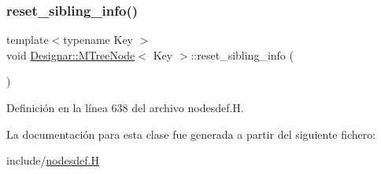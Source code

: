 \subsubsection{\texorpdfstring{reset\+\_\+sibling\+\_\+info()}{reset\_sibling\_info()}}
{\footnotesize\ttfamily template$<$typename Key $>$ \\
void \hyperlink{class_designar_1_1_m_tree_node}{Designar\+::\+M\+Tree\+Node}$<$ Key $>$\+::reset\+\_\+sibling\+\_\+info (\begin{DoxyParamCaption}{ }\end{DoxyParamCaption})\hspace{0.3cm}{\ttfamily [inline]}}



Definición en la línea 638 del archivo nodesdef.\+H.



La documentación para esta clase fue generada a partir del siguiente fichero\+:\begin{DoxyCompactItemize}
\item 
include/\hyperlink{nodesdef_8_h}{nodesdef.\+H}\end{DoxyCompactItemize}
